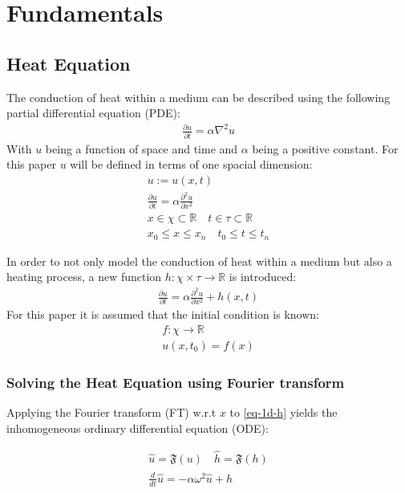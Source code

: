 \chapter{Fundamentals}
\section{Heat Equation} \label{HE}
The conduction of heat  within a medium can be described using the following partial differential equation (PDE):
\begin{gather}
\frac{\partial u}{\partial t} = \alpha \nabla^{2} u
\end{gather}
With \(u\) being a function of space and time and \(\alpha\) being a positive constant.
For this paper \(u\) will be defined in terms of one spacial dimension:
\begin{gather}
u := u(x, t) \\
\frac{\partial u}{\partial t} = \alpha \frac{\partial^{2} u}{\partial x^{2}} \\
x \in \chi \subset \mathbb{R} \quad t \in \tau \subset \mathbb{R} \\
x_{0} \leq x \leq x_{n} \quad t_{0} \leq t \leq t_{n} 
\end{gather}
\cite{Gustafsson2011}

In order to not only model the conduction of heat within a medium but also a heating process, a new function \(h: \chi \times \tau \rightarrow  \mathbb{R}\) is introduced:
\begin{gather}
\frac{\partial u}{\partial t} = \alpha \frac{\partial^{2} u}{\partial x^{2}} + h(x,t) \label{eq-1d-h}
\end{gather}
For this paper it is assumed that the initial condition is known:
\begin{gather}
f: \chi \rightarrow \mathbb{R} \\
u(x, t_{0}) = f(x) 
\end{gather} 
\subsection{Solving the Heat Equation using Fourier transform}
Applying the Fourier transform (FT) w.r.t \(x\) to \ref{eq-1d-h} yields the inhomogeneous ordinary differential equation (ODE):

\begin{gather}
\hat{u} = \mathfrak{F}(u) \quad \hat{h} = \mathfrak{F}(h) \\
\frac{d}{dt} \hat{u} = -\alpha\omega^{2}\hat{u} + \hat{h} \label{eq-1d-h-ft}
\end{gather}

